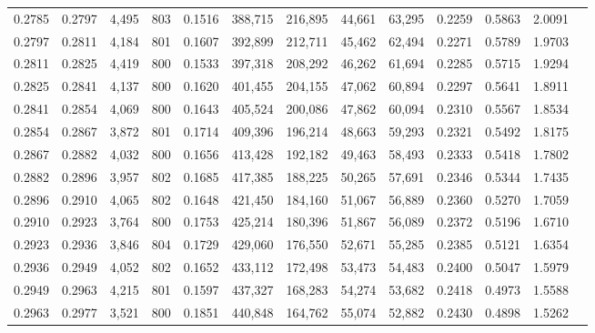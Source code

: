 \begin{tabular}{rrrrrrrrrrrrr}
0.2785 & 0.2797 &  4,495 & 803 &                                     0.1516 & 388,715 & 216,895 &  44,661 &  63,295 & 0.2259 & 0.5863 & 2.0091 \\
0.2797 & 0.2811 &  4,184 & 801 &                                     0.1607 & 392,899 & 212,711 &  45,462 &  62,494 & 0.2271 & 0.5789 & 1.9703 \\
0.2811 & 0.2825 &  4,419 & 800 &                                     0.1533 & 397,318 & 208,292 &  46,262 &  61,694 & 0.2285 & 0.5715 & 1.9294 \\
0.2825 & 0.2841 &  4,137 & 800 &                                     0.1620 & 401,455 & 204,155 &  47,062 &  60,894 & 0.2297 & 0.5641 & 1.8911 \\
0.2841 & 0.2854 &  4,069 & 800 &                                     0.1643 & 405,524 & 200,086 &  47,862 &  60,094 & 0.2310 & 0.5567 & 1.8534 \\
0.2854 & 0.2867 &  3,872 & 801 &                                     0.1714 & 409,396 & 196,214 &  48,663 &  59,293 & 0.2321 & 0.5492 & 1.8175 \\
0.2867 & 0.2882 &  4,032 & 800 &                                     0.1656 & 413,428 & 192,182 &  49,463 &  58,493 & 0.2333 & 0.5418 & 1.7802 \\
0.2882 & 0.2896 &  3,957 & 802 &                                     0.1685 & 417,385 & 188,225 &  50,265 &  57,691 & 0.2346 & 0.5344 & 1.7435 \\
0.2896 & 0.2910 &  4,065 & 802 &                                     0.1648 & 421,450 & 184,160 &  51,067 &  56,889 & 0.2360 & 0.5270 & 1.7059 \\
0.2910 & 0.2923 &  3,764 & 800 &                                     0.1753 & 425,214 & 180,396 &  51,867 &  56,089 & 0.2372 & 0.5196 & 1.6710 \\
0.2923 & 0.2936 &  3,846 & 804 &                                     0.1729 & 429,060 & 176,550 &  52,671 &  55,285 & 0.2385 & 0.5121 & 1.6354 \\
0.2936 & 0.2949 &  4,052 & 802 &                                     0.1652 & 433,112 & 172,498 &  53,473 &  54,483 & 0.2400 & 0.5047 & 1.5979 \\
0.2949 & 0.2963 &  4,215 & 801 &                                     0.1597 & 437,327 & 168,283 &  54,274 &  53,682 & 0.2418 & 0.4973 & 1.5588 \\
0.2963 & 0.2977 &  3,521 & 800 &                                     0.1851 & 440,848 & 164,762 &  55,074 &  52,882 & 0.2430 & 0.4898 & 1.5262 \\

\end{tabular}
